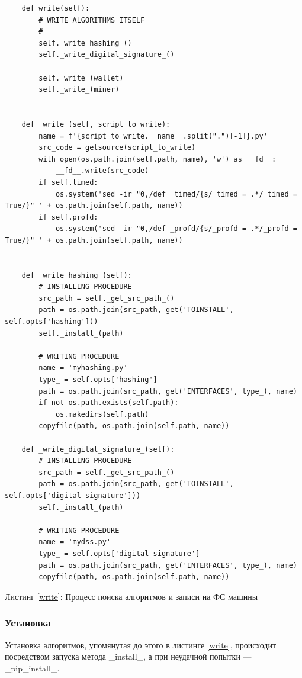 \begin{center}
\begin{lstlisting}
    def write(self):
        # WRITE ALGORITHMS ITSELF
        #
        self._write_hashing_()
        self._write_digital_signature_()

        self._write_(wallet)
        self._write_(miner)


    def _write_(self, script_to_write):
        name = f'{script_to_write.__name__.split(".")[-1]}.py'
        src_code = getsource(script_to_write)
        with open(os.path.join(self.path, name), 'w') as __fd__:
            __fd__.write(src_code)
        if self.timed:
            os.system('sed -ir "0,/def _timed/{s/_timed = .*/_timed = True/}" ' + os.path.join(self.path, name))
        if self.profd:
            os.system('sed -ir "0,/def _profd/{s/_profd = .*/_profd = True/}" ' + os.path.join(self.path, name))


    def _write_hashing_(self):
        # INSTALLING PROCEDURE
        src_path = self._get_src_path_()
        path = os.path.join(src_path, get('TOINSTALL', self.opts['hashing']))
        self._install_(path)

        # WRITING PROCEDURE
        name = 'myhashing.py'
        type_ = self.opts['hashing']
        path = os.path.join(src_path, get('INTERFACES', type_), name)
        if not os.path.exists(self.path):
            os.makedirs(self.path)
        copyfile(path, os.path.join(self.path, name))

    def _write_digital_signature_(self):
        # INSTALLING PROCEDURE
        src_path = self._get_src_path_()
        path = os.path.join(src_path, get('TOINSTALL', self.opts['digital signature']))
        self._install_(path)

        # WRITING PROCEDURE
        name = 'mydss.py'
        type_ = self.opts['digital signature']
        path = os.path.join(src_path, get('INTERFACES', type_), name)
        copyfile(path, os.path.join(self.path, name))
\end{lstlisting}\label{write}
    Листинг \ref{write}: Процесс поиска алгоритмов и записи на ФС машины
\end{center}

\subsubsection{Установка}
Установка алгоритмов, упомянутая до этого в листинге \ref{write}, происходит
посредством запуска метода \_install\_, а при неудачной попытки ---
\_pip\_install\_.


